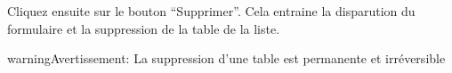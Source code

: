 \documentclass[letterpaper,10pt,french]{sphinxmanual}
\begin{document}

Cliquez ensuite sur le bouton ``Supprimer''. Cela entraine la
disparution du formulaire et la suppression de la table de la liste.

\begin{notice}{warning}{Avertissement:}
La suppression d'une table est permanente et irréversible
\end{notice}
\end{document}

